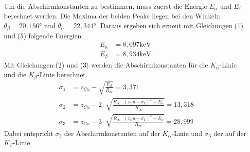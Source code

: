 \noindent Um die Abschirmkonstanten zu bestimmen, muss zuerst die Energie $E_\alpha$ und $E_\beta$ berechnet werden. 
Die Maxima der beiden Peaks liegen bei den Winkeln $\theta_{\beta} = 20,156 $° und $\theta_{\alpha} = 22,344$°.
Daraus ergeben sich erneut mit Gleichungen (1) und (5) folgende Energien
\begin{align*}
E_\alpha &= 8,097 \si{\keV} \\
E_\beta &= 8,934 \si{\keV}.
\end{align*}
Mit Gleichungen (2) und (3) werden die Abschirmkonstanten für die $K_{\alpha}$-Linie und die $K_{\beta}$-Linie berechnet.
\begin{align*}
\sigma_1 &= z_{Cu} - \sqrt{\frac{E_\beta}{R_\infty}} = 3,371\\
\sigma_2 &= z_{Cu} - 2 \cdot \sqrt{\frac{R_\infty \cdot (z_Cu - \sigma_1)^2 - E_\alpha}{R_\infty}} = 13,318 \\
\sigma_3 &= z_{Cu} - 3 \cdot \sqrt{\frac{R_\infty \cdot (z_Cu - \sigma_1)^2 - E_\beta}{R_\infty}} = 28,999
\end{align*}
Dabei entspricht $\sigma_2$ der Abschirmkonstanten auf der $K_{\alpha}$-Linie und $\sigma_3$ der auf der $K_{\beta}$-Linie.
